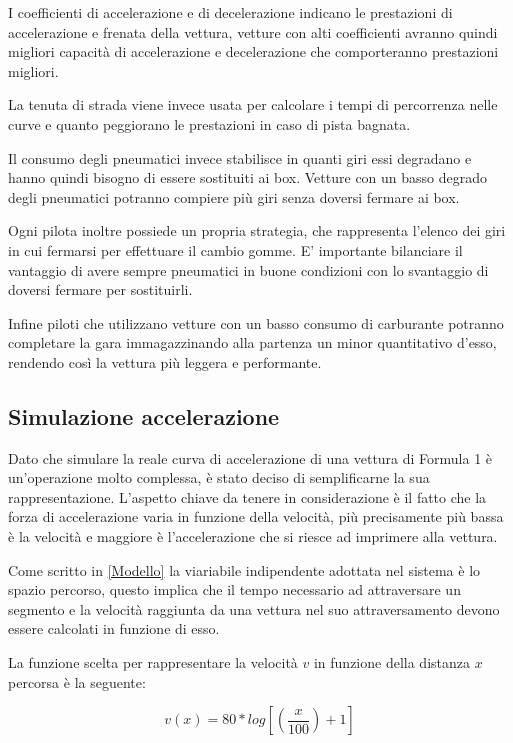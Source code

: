 \documentclass[a4paper,11pt, twoside]{book}
\begin{document}
      I coefficienti di accelerazione e di decelerazione indicano le prestazioni di accelerazione e frenata della vettura, 
      vetture con alti coefficienti avranno quindi migliori capacità di accelerazione e decelerazione
      che comporteranno prestazioni migliori.
      
      La tenuta di strada viene invece usata per calcolare i tempi di percorrenza nelle curve e quanto peggiorano 
      le prestazioni in caso di pista bagnata.
      
      Il consumo degli pneumatici invece stabilisce in quanti giri essi degradano e hanno quindi bisogno di essere sostituiti
      ai box. Vetture con un basso degrado degli pneumatici potranno compiere più giri senza doversi fermare ai box.
      
      Ogni pilota inoltre possiede un propria strategia, che rappresenta l'elenco dei giri in cui fermarsi per effettuare il
      cambio gomme. E' importante bilanciare il vantaggio di avere sempre pneumatici in buone condizioni con lo svantaggio
      di doversi fermare per sostituirli.
      
      Infine piloti che utilizzano vetture con un basso consumo di carburante potranno completare la gara
      immagazzinando alla partenza un minor quantitativo d'esso, rendendo così la vettura più leggera e performante.
      
      \subsection{Simulazione accelerazione}
	Dato che simulare la reale curva di accelerazione di una vettura di Formula 1 è un'operazione molto complessa,
	è stato deciso di semplificarne la sua rappresentazione.
	L'aspetto chiave da tenere in considerazione è il fatto che la forza di accelerazione varia in funzione della velocità,
	più precisamente più bassa è la velocità e maggiore è l'accelerazione che si riesce ad imprimere alla vettura.
	
	Come scritto in \ref{Modello} la viariabile indipendente adottata nel sistema è lo spazio percorso, questo implica
	che il tempo necessario ad attraversare un segmento e la velocità raggiunta da una vettura nel suo attraversamento
	devono essere calcolati in funzione di esso. 
	
	La funzione scelta per rappresentare la velocità $v$ in funzione della distanza $x$ percorsa è 
	la seguente:
	
	$$v(x)=80*log[(\frac{x}{100})+1]$$
	
\end{document}
